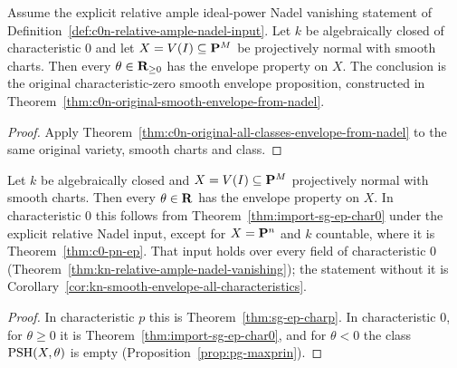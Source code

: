 \begin{theorem}\label{thm:import-sg-ep-char0}
\leanok
{}
Assume the explicit relative ample ideal-power Nadel vanishing statement
of Definition~\ref{def:c0n-relative-ample-nadel-input}.
Let $k$ be algebraically closed of characteristic $0$ and let
$X=V(I)\subseteq\mathbf{P}^M$ be projectively normal with smooth charts.
Then every $\theta\in\mathbf{R}_{\ge0}$ has the envelope property on $X$.
The conclusion is the original characteristic-zero smooth envelope
proposition, constructed in
Theorem~\ref{thm:c0n-original-smooth-envelope-from-nadel}.
\end{theorem}
\begin{proof}
Apply Theorem~\ref{thm:c0n-original-all-classes-envelope-from-nadel}
to the same original variety, smooth charts and class.
\end{proof}

\begin{theorem}\label{thm:sg-ep}
\leanok
{}
Let $k$ be algebraically closed and $X=V(I)\subseteq\mathbf{P}^M$ projectively normal with smooth charts. Then every $\theta\in\mathbf{R}$ has the envelope
property on $X$. In characteristic $0$ this follows from Theorem~\ref{thm:import-sg-ep-char0} under the explicit relative Nadel input, except for $X=\mathbf{P}^n$ and $k$ countable,
where it is Theorem~\ref{thm:c0-pn-ep}. That input holds over every field of characteristic $0$
(Theorem~\ref{thm:kn-relative-ample-nadel-vanishing}); the statement without it is
Corollary~\ref{cor:kn-smooth-envelope-all-characteristics}.
\end{theorem}

\begin{proof}
In characteristic $p$ this is Theorem~\ref{thm:sg-ep-charp}. In characteristic $0$, for $\theta\ge0$ it is Theorem~\ref{thm:import-sg-ep-char0},
and for $\theta<0$ the class $\operatorname{PSH}(X,\theta)$ is empty (Proposition~\ref{prop:pg-maxprin}).
\end{proof}

